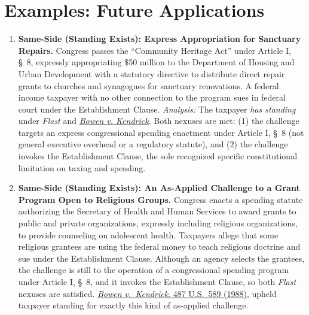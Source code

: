\documentclass[12pt]{article}
\begin{document}
\section{Examples: Future Applications}
\begin{enumerate}

\item \textbf{Same-Side (Standing Exists): Express Appropriation for Sanctuary Repairs.} Congress passes the ``Community Heritage Act'' under Article I, \S\ 8, expressly appropriating \$50 million to the Department of Housing and Urban Development with a statutory directive to distribute direct repair grants to churches and synagogues for sanctuary renovations. A federal income taxpayer with no other connection to the program sues in federal court under the Establishment Clause. \textit{Analysis:} The taxpayer \textit{has standing} under \textit{Flast} and \href{https://supreme.justia.com/cases/federal/us/487/589/}{\textit{Bowen v. Kendrick}}. Both nexuses are met: (1) the challenge targets an express congressional spending enactment under Article I, \S\ 8 (not general executive overhead or a regulatory statute), and (2) the challenge invokes the Establishment Clause, the sole recognized specific constitutional limitation on taxing and spending.

\item \textbf{Same-Side (Standing Exists): An As-Applied Challenge to a Grant Program Open to Religious Groups.} Congress enacts a spending statute authorizing the Secretary of Health and Human Services to award grants to public and private organizations, expressly including religious organizations, to provide counseling on adolescent health. Taxpayers allege that some religious grantees are using the federal money to teach religious doctrine and sue under the Establishment Clause. Although an agency selects the grantees, the challenge is still to the operation of a congressional spending program under Article I, \S\ 8, and it invokes the Establishment Clause, so both \textit{Flast} nexuses are satisfied. \href{https://supreme.justia.com/cases/federal/us/487/589/}{\textit{Bowen v.\ Kendrick}, 487 U.S.\ 589 (1988)}, upheld taxpayer standing for exactly this kind of as-applied challenge.


\end{enumerate}
\end{document}
